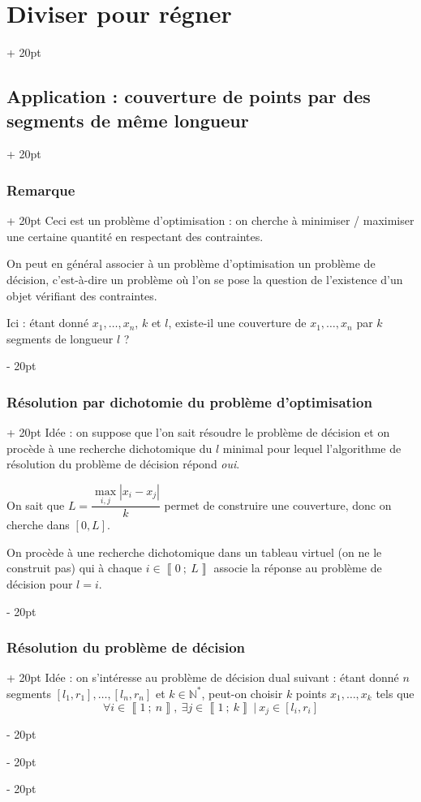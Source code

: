 \documentclass[a4paper, 12pt, twoside]{article}
\newcommand{\N}{\mathbb{N}} %
\newcommand{\nset}[2]{\left\llbracket #1\ ;\ #2 \right\rrbracket}
\newcommand{\abs}[1]{\left\lvert #1 \right\rvert} %
\newcommand{\ind}[1][20pt]{\advance\leftskip + #1}
\newcommand{\deind}[1][20pt]{\advance\leftskip - #1}
\newenvironment{indt}[2][20pt]{#2 \par \ind[#1]}{\par \deind} %
\begin{document}
\begin{indt}{\section{Diviser pour régner}}
\begin{indt}{\subsection{Application : couverture de points par des segments de même longueur}}
            \vspace{12pt}
            
            \begin{indt}{\subsubsection{Remarque}}
                Ceci est un problème d'optimisation : on cherche à minimiser / maximiser une certaine quantité en respectant des contraintes.
                
                On peut en général associer à un problème d'optimisation un problème de décision, c'est-à-dire un problème où l'on se pose la question de l'existence d'un objet vérifiant des contraintes.
                
                Ici : étant donné $x_1, \ldots, x_n$, $k$ et $l$, existe-il une couverture de $x_1, \ldots, x_n$ par $k$ segments de longueur $l$ ?
            \end{indt}
            
            \vspace{12pt}
            
            \begin{indt}{\subsubsection{Résolution par dichotomie du problème d'optimisation}}
                Idée : on suppose que l'on sait résoudre le problème de décision et on procède à une recherche dichotomique du $l$ minimal pour lequel l'algorithme de résolution du problème de décision répond \textit{oui}.
                
                On sait que $L = \dfrac{\max\limits_{i, j}\abs{x_i - x_j}}{k}$ permet de construire une couverture, donc on cherche dans $[0, L]$.
                
                On procède à une recherche dichotomique dans un tableau virtuel (on ne le construit pas) qui à chaque $i \in \nset 0 L$ associe la réponse au problème de décision pour $l = i$.
            \end{indt}
            
            \vspace{12pt}
            
            \begin{indt}{\subsubsection{Résolution du problème de décision}}
                Idée : on s'intéresse au problème de décision dual suivant : étant donné $n$ segments $[l_1, r_1], \ldots, [l_n, r_n]$ et $k \in \N^*$, peut-on choisir $k$ points $x_1, \ldots, x_k$ tels que
                    \[ \forall i \in \nset 1 n,\ \exists j \in \nset 1 k\ |\ x_j \in [l_i, r_i] \]
                

\end{indt}
\end{indt}
\end{indt}
\end{document}
